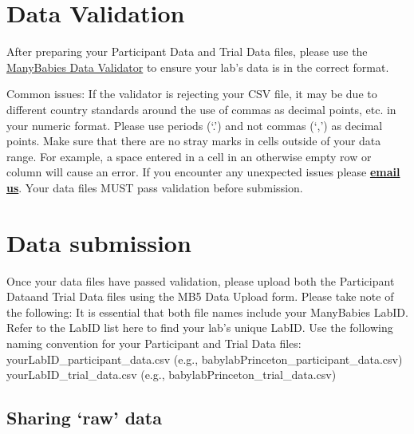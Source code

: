 \documentclass[
  letterpaper,
  DIV=11,
  numbers=noendperiod,
  oneside]{scrreprt}
\begin{document}
\section{Data Validation}\label{data-validation}

After preparing your Participant Data and Trial Data files, please use
the \href{https://manybabies.org/validator/}{ManyBabies Data Validator}
to ensure your lab's data is in the correct format.

Common issues: If the validator is rejecting your CSV file, it may be
due to different country standards around the use of commas as decimal
points, etc. in your numeric format. Please use periods (`.') and not
commas (`,') as decimal points. Make sure that there are no stray marks
in cells outside of your data range. For example, a space entered in a
cell in an otherwise empty row or column will cause an error. If you
encounter any unexpected issues please
\href{mailto:mb5@manybabies.org}{\textbf{email us}}. Your data files
MUST pass validation before submission.

\section{Data submission}\label{data-submission}

Once your data files have passed validation, please upload both the
Participant Dataand Trial Data files using the MB5 Data Upload form.
Please take note of the following: It is essential that both file names
include your ManyBabies LabID. Refer to the LabID list here to find your
lab's unique LabID. Use the following naming convention for your
Participant and Trial Data files: yourLabID\_participant\_data.csv
(e.g., babylabPrinceton\_participant\_data.csv)
yourLabID\_trial\_data.csv (e.g., babylabPrinceton\_trial\_data.csv)

\subsection{Sharing `raw' data}\label{sharing-raw-data}
\end{document}
